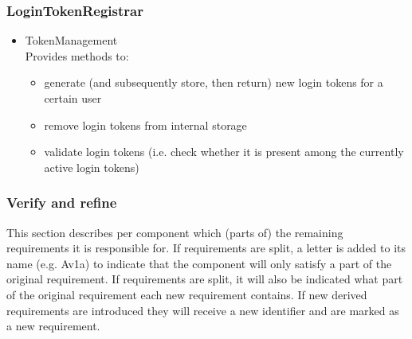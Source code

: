 \documentclass[a4paper,10pt]{article}
\begin{document}
\subsubsection*{LoginTokenRegistrar}
\begin{itemize}
	\item TokenManagement \\
	Provides methods to:
	\begin{itemize}
		\item generate (and subsequently store, then return) new login tokens for a certain user
		\item remove login tokens from internal storage
		\item validate login tokens (i.e. check whether it is present among the currently active login tokens)
	\end{itemize} 
\end{itemize}

\subsubsection{Verify and refine}
This section describes per component which (parts of) the remaining requirements it is responsible for. If requirements are split, a letter is added to its name (e.g. Av1a) to indicate that the component will only satisfy a part of the original requirement. If requirements are split, it will also be indicated what part of the original requirement each new requirement contains. If new derived requirements are introduced they will receive a new identifier and are marked as a new requirement.
\end{document}
